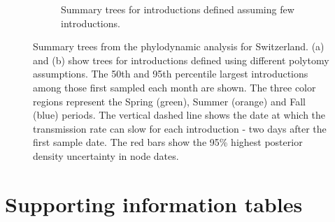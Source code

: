 \documentclass[9pt,twoside,lineno]{pnas-new}
\begin{document}
\begin{landscape}
\begin{figure}[h!]
\begin{subfigure}[b]{0.65\textwidth}
\caption{Summary trees for introductions defined assuming few introductions.}
\end{subfigure}
\caption{Summary trees from the phylodynamic analysis for Switzerland. (a) and (b) show trees for introductions defined using different polytomy assumptions. The 50th and 95th percentile largest introductions among those first sampled each month are shown. The three color regions represent the Spring (green), Summer (orange) and Fall (blue) periods. The vertical dashed line shows the date at which the transmission rate can slow for each introduction - two days after the first sample date. The red bars show the 95\% highest posterior density uncertainty in node dates.}  
\label{fig:logged-chains}
\end{figure}
\end{landscape}
\newpage

\section{Supporting information tables}

\end{document}
